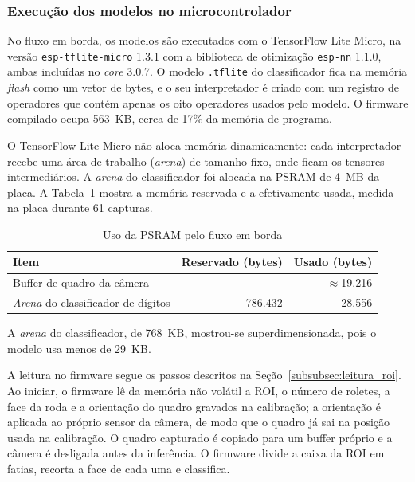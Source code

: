 \subsubsection{Execução dos modelos no microcontrolador}
\label{subsubsec:tflm}

No fluxo em borda, os modelos são executados com o TensorFlow Lite Micro, na versão
\texttt{esp-tflite-micro} 1.3.1 com a biblioteca de otimização \texttt{esp-nn} 1.1.0, ambas
incluídas no \textit{core} 3.0.7. O modelo \texttt{.tflite} do classificador fica na memória
\textit{flash} como um vetor de bytes, e o seu interpretador é criado com um registro de
operadores que contém apenas os oito operadores usados pelo modelo. O firmware compilado ocupa 563~KB, cerca de
17\% da memória de programa.

O TensorFlow Lite Micro não aloca memória dinamicamente: cada interpretador recebe uma
área de trabalho (\textit{arena}) de tamanho fixo, onde ficam os tensores intermediários.
A \textit{arena} do classificador foi alocada na PSRAM de 4~MB da placa. A
Tabela~\ref{tab:memoria_tflm} mostra a memória reservada e a efetivamente usada, medida na
placa durante 61 capturas.

\begin{table}[H]
    \centering
    \caption{Uso da PSRAM pelo fluxo em borda}
    \label{tab:memoria_tflm}
    \begin{tabular}{@{}lrr@{}}
        \toprule
        \textbf{Item} & \textbf{Reservado (bytes)} & \textbf{Usado (bytes)} \\
        \midrule
        Buffer de quadro da câmera & --- & $\approx$19.216 \\
        \textit{Arena} do classificador de dígitos & 786.432 & 28.556 \\
        \bottomrule
    \end{tabular}
\end{table}

A \textit{arena} do classificador, de 768~KB, mostrou-se
superdimensionada, pois o modelo usa menos de 29~KB.

A leitura no firmware segue os passos descritos na
Seção~\ref{subsubsec:leitura_roi}. Ao iniciar, o firmware lê da memória não volátil a ROI,
o número de roletes, a face da roda e a orientação do quadro gravados na calibração; a
orientação é aplicada ao próprio sensor da câmera, de modo que o quadro já sai na posição
usada na calibração. O quadro capturado é copiado para um buffer próprio e a câmera é
desligada antes da inferência. O firmware divide a caixa da ROI em fatias, recorta a face de cada uma e classifica.

